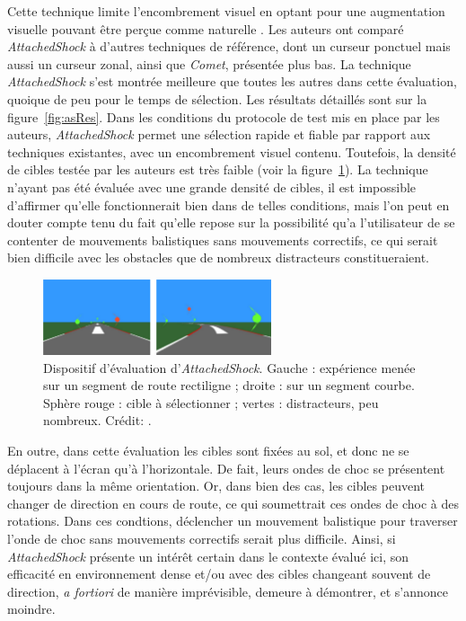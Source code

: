 	Cette technique limite l'encombrement visuel en optant pour une augmentation visuelle pouvant être perçue comme \og naturelle \fg{}. Les auteurs ont comparé \emph{AttachedShock} à d'autres techniques de référence, dont un curseur ponctuel mais aussi un curseur zonal, ainsi que \emph{Comet}, présentée plus bas. La technique \emph{AttachedShock} s'est montrée meilleure que toutes les autres dans cette évaluation, quoique de peu pour le temps de sélection. Les résultats détaillés sont sur la figure~\ref{fig:asRes}. Dans les conditions du protocole de test mis en place par les auteurs, \emph{AttachedShock} permet une sélection rapide et fiable par rapport aux techniques existantes, avec un encombrement visuel contenu. Toutefois, la densité de cibles testée par les auteurs est très faible (voir la figure~\ref{fig:asDensity}). La technique n'ayant pas été évaluée avec une grande densité de cibles, il est impossible d'affirmer qu'elle fonctionnerait bien dans de telles conditions, mais l'on peut en douter compte tenu du fait qu'elle repose sur la possibilité qu'a l'utilisateur de se \og contenter \fg{} de mouvements balistiques sans mouvements correctifs, ce qui serait bien difficile avec les obstacles que de nombreux distracteurs constitueraient.
	
	\begin{figure}[htbp]
		\centering
		\includegraphics[width=0.6\textwidth]{figures/ch2/asDensity}
		\caption[\emph{AttachedShock}, densité de cibles]{Dispositif d'évaluation d'\emph{AttachedShock}. Gauche : expérience menée sur un segment de route rectiligne ; droite : sur un segment courbe. Sphère rouge : cible à sélectionner ;  vertes : distracteurs, peu nombreux. Crédit: \cite{you2012attachedshock}.}
		\label{fig:asDensity}
	\end{figure}
	
	En outre, dans cette évaluation les cibles sont fixées au sol, et donc ne se déplacent à l'écran qu'à l'horizontale. De fait, leurs ondes de choc se présentent toujours dans la même orientation. Or, dans bien des cas, les cibles peuvent changer de direction en cours de route, ce qui soumettrait ces ondes de choc à des rotations. Dans ces condtions, déclencher un mouvement balistique pour traverser l'onde de choc sans mouvements correctifs serait plus difficile. Ainsi, si \emph{AttachedShock} présente un intérêt certain dans le contexte évalué ici, son efficacité en environnement dense et/ou avec des cibles changeant souvent de direction, \emph{a fortiori} de manière imprévisible, demeure à démontrer, et s'annonce moindre.
	

